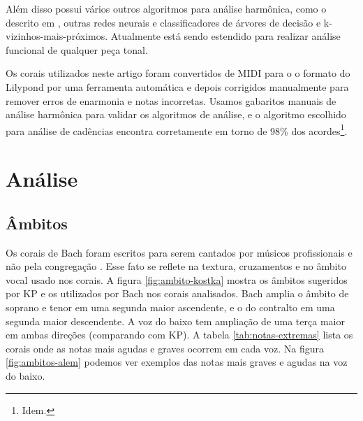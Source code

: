 Além disso \rameau{} possui vários outros algoritmos para análise
harmônica, como o descrito em \cite{pardo.ea00:automated}, outras
redes neurais e classificadores de árvores de decisão e
k-vizinhos-mais-próximos. Atualmente \rameau{} está sendo estendido
para realizar análise funcional de qualquer peça tonal.

Os corais utilizados neste artigo foram convertidos de MIDI para o o
formato do Lilypond por uma ferramenta automática e depois corrigidos
manualmente para remover erros de enarmonia e notas incorretas. Usamos
gabaritos manuais de análise harmônica para validar os algoritmos de
análise, e o algoritmo escolhido para análise de cadências encontra
corretamente em torno de 98\% dos acordes\footnote{Idem.}.

\section{Análise}
\label{sec:analise}

\subsection{Âmbitos}
\label{sec:ambitos}

Os corais de Bach foram escritos para serem cantados por músicos
profissionais e não pela congregação \cite{bach41:371} . Esse fato
se reflete na textura, cruzamentos e no âmbito vocal usado nos corais.
A figura \ref{fig:ambito-kostka} mostra os âmbitos sugeridos por KP e
os utilizados por Bach nos corais analisados. Bach amplia o âmbito de
soprano e tenor em uma segunda maior ascendente, e o do contralto em
uma segunda maior descendente. A voz do baixo tem ampliação de uma
terça maior em ambas direções (comparando com KP). A tabela
\ref{tab:notas-extremas} lista os corais onde as notas mais agudas e
graves ocorrem em cada voz. Na figura \ref{fig:ambitos-alem} podemos
ver exemplos das notas mais graves e agudas na voz do baixo.


